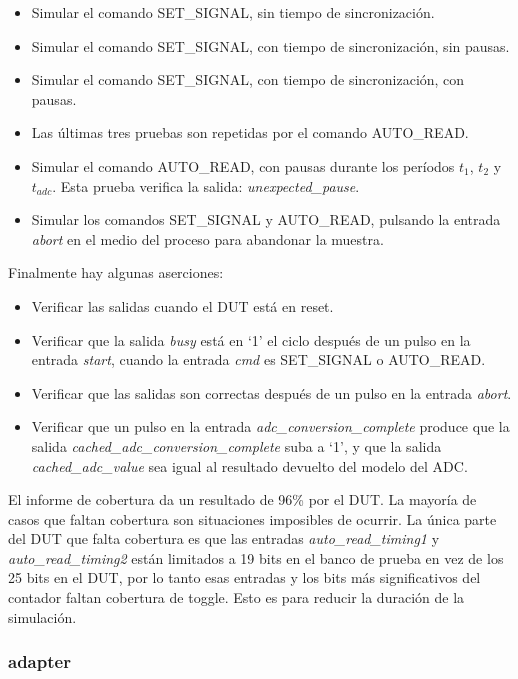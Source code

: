 \documentclass[a4paper, twoside, 11pt]{report}
\begin{document}
\begin{itemize}
  \item Simular el comando SET\_SIGNAL, sin tiempo de sincronización.
  \item Simular el comando SET\_SIGNAL, con tiempo de sincronización, sin pausas.
  \item Simular el comando SET\_SIGNAL, con tiempo de sincronización, con pausas.
  \item Las últimas tres pruebas son repetidas por el comando AUTO\_READ.
  \item Simular el comando AUTO\_READ, con pausas durante los períodos $t_1$, $t_2$ y $t_{adc}$. Esta prueba verifica la salida: \textit{unexpected\_pause}.
  \item Simular los comandos SET\_SIGNAL y AUTO\_READ, pulsando la entrada \textit{abort} en el medio del proceso para abandonar la muestra.
\end{itemize}

Finalmente hay algunas aserciones:

\begin{itemize}
  \item Verificar las salidas cuando el DUT está en reset.
  \item Verificar que la salida \textit{busy} está en ‘1’ el ciclo después de un pulso en la entrada \textit{start}, cuando la entrada \textit{cmd} es SET\_SIGNAL o AUTO\_READ.
  \item Verificar que las salidas son correctas después de un pulso en la entrada \textit{abort}.
  \item Verificar que un pulso en la entrada \textit{adc\_conversion\_complete} produce que la salida \textit{cached\_adc\_conversion\_complete} suba a ‘1’, y que la salida \textit{cached\_adc\_value} sea igual al resultado devuelto del modelo del ADC.
\end{itemize}

El informe de cobertura da un resultado de 96\% por el DUT. La mayoría de casos que faltan cobertura son situaciones imposibles de ocurrir. La única parte del DUT que falta cobertura es que las entradas \textit{auto\_read\_timing1} y \textit{auto\_read\_timing2} están limitados a 19 bits en el banco de prueba en vez de los 25 bits en el DUT, por lo tanto esas entradas y los bits más significativos del contador faltan cobertura de toggle. Esto es para reducir la duración de la simulación.

\FloatBarrier
\subsubsection{adapter}
\end{document}
